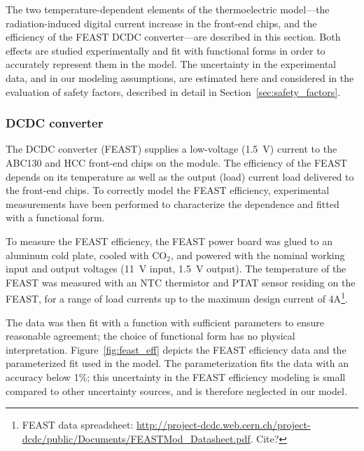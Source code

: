 
The two temperature-dependent elements of the thermoelectric model---the
radiation-induced digital current increase in the front-end chips, and the
efficiency of the FEAST DCDC converter---are described in this section.
Both effects are studied experimentally and fit with functional forms
in order to accurately represent them in the model.
The uncertainty in the experimental data, and in our modeling assumptions,
are estimated here and considered in the evaluation of safety factors,
described in detail in Section~\ref{sec:safety_factors}.

\subsubsection{DCDC converter}

The DCDC converter (FEAST) supplies a low-voltage (1.5~V) current to the ABC130 and HCC front-end
chips on the module.
The efficiency of the FEAST depends on its temperature as well as the output (load) current
load delivered to the front-end chips. To correctly model the FEAST efficiency, experimental
measurements have been performed to characterize the dependence and fitted with a functional form.

To measure the FEAST efficiency, the FEAST power board was glued to an aluminum cold plate, cooled
with CO$_2$, and powered with the nominal working input and output voltages (11~V input, 1.5~V output).
The temperature of the FEAST was measured with an NTC thermistor and PTAT sensor residing on the FEAST,
for a range of load currents up to the maximum design current of 4A\footnote
{
FEAST data spreadsheet: \url{http://project-dcdc.web.cern.ch/project-dcdc/public/Documents/FEASTMod_Datasheet.pdf}.
Cite?
}.

The data was then fit with a function with sufficient parameters to ensure reasonable agreement; the
choice of functional form has no physical interpretation. Figure~\ref{fig:feast_eff} depicts the
FEAST efficiency data and the parameterized fit used in the model. The parameterization fits the data
with an accuracy below 1\%; this uncertainty in the FEAST efficiency modeling is small
compared to other uncertainty sources, and is therefore neglected in our model.

